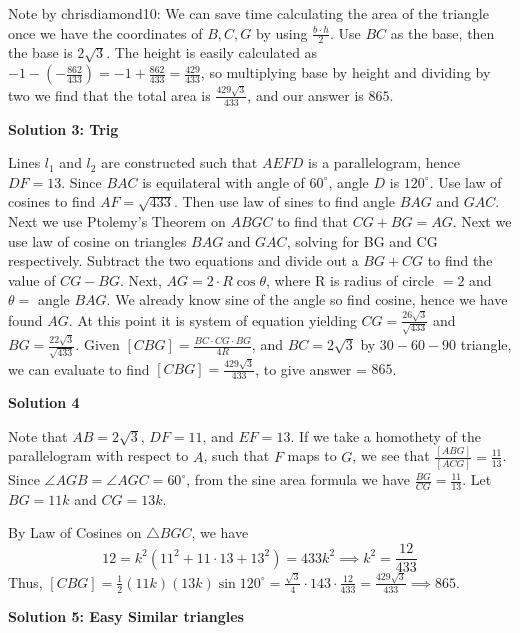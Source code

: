 \begin{enumerate}
 Note by chrisdiamond10: We can save time calculating the area of the triangle once we have the coordinates of $B,C,G$ by using $\frac{b\cdot h}{2}$. Use $BC$ as the base, then the base is $2\sqrt{3}$. The height is easily calculated as $-1-\left(-\frac{862}{433}\right)=-1+\frac{862}{433}=\frac{429}{433}$, so multiplying base by height and dividing by two we find that the total area is $\frac{429\sqrt{3}}{433}$, and our answer is $\boxed{865}$.

 



\textbf{Solution 3: Trig}

Lines $l_1$ and $l_2$ are constructed such that $AEFD$ is a parallelogram, hence $DF = 13$. Since $BAC$ is equilateral with angle of $60^{\circ}$, angle $D$ is $120^{\circ}$. Use law of cosines to find $AF = \sqrt{433}$. Then use law of sines to find angle $BAG$ and $GAC$. Next we use Ptolemy's Theorem on $ABGC$ to find that $CG + BG = AG$. Next we use law of cosine on triangles $BAG$ and $GAC$, solving for BG and CG respectively. Subtract the two equations and divide out a $BG + CG$ to find the value of $CG - BG$. Next, $AG = 2\cdot R \cos{\theta}$, where R is radius of circle $= 2$ and $\theta =$ angle $BAG$. We already know sine of the angle so find cosine, hence we have found $AG$. At this point it is system of equation yielding $CG = \frac{26\sqrt{3}}{\sqrt{433}}$ and $BG = \frac{22\sqrt{3}}{\sqrt{433}}$. Given $[CBG] = \frac{BC \cdot CG \cdot BG}{4R}$, and $BC = 2\sqrt{3}$ by $30-60-90$ triangle, we can evaluate to find $[CBG] = \frac{429\sqrt{3}}{433}$, to give answer = $\boxed{865}$.

 



\textbf{Solution 4}

Note that $AB=2\sqrt3$, $DF=11$, and $EF=13$. If we take a homothety of the parallelogram with respect to $A$, such that $F$ maps to $G$, we see that $\frac{[ABG]}{[ACG]}=\frac{11}{13}$. Since $\angle AGB=\angle AGC=60^{\circ}$, from the sine area formula we have $\frac{BG}{CG}=\frac{11}{13}$. Let $BG=11k$ and $CG=13k$.

 By Law of Cosines on $\triangle BGC$, we have
 \[12=k^2(11^2+11\cdot13+13^2)=433k^2\implies k^2=\frac{12}{433}\]Thus, $[CBG]=\frac12 (11k)(13k)\sin 120^{\circ} = \frac{\sqrt3}{4}\cdot 143\cdot \frac{12}{433}=\frac{429\sqrt3}{433}\implies\boxed{865}$.

 



\textbf{Solution 5: Easy Similar triangles}


\end{enumerate}
